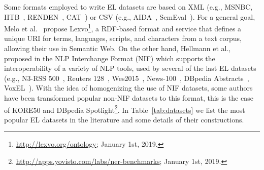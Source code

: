 \documentclass[sigconf]{acmart}
\begin{document}
Some formats employed to write EL datasets are based on XML (e.g., MSNBC, IITB~\cite{IITB2009}, RENDEN~\cite{renden2016}, CAT~\cite{meantime2016}) or CSV (e.g., AIDA~\cite{aida2011}, SemEval~\cite{moro2015semeval}). For a general goal, Melo et al.~\cite{Lexvo2008} propose Lexvo\footnote{\url{http://lexvo.org/ontology}; January 1st, 2019.}, a RDF-based format and service that defines a unique URI for terms, languages, scripts, and characters from a text corpus, allowing their use in Semantic Web. %
On the other hand, Hellmann et al., proposed in \cite{NIFpaper} the NLP Interchange Format (NIF) which supports the interoperability of a variety of NLP tools, used by several of the last EL datasets (e.g., N3-RSS 500~\cite{N3}, Reuters 128~\cite{N3}, Wes2015~\cite{wes2015}, News-100~\cite{N3}, DBpedia Abstracts~\cite{abstracts2016}, VoxEL~\cite{VoxEL2018}). With the idea of homogenizing the use of NIF datasets, some authors have been transformed popular non-NIF datasets to this format, this is the case of  KORE50 and DBpedia Spotlight\footnote{\url{http://apps.yovisto.com/labs/ner-benchmarks}; January 1st, 2019.}. In Table~\ref{tab:datasets} we list the most popular EL datasets in the literature and some details of their constructions.
\end{document}

